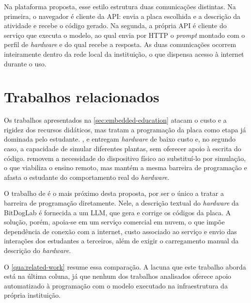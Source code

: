 Na plataforma proposta, esse estilo estrutura duas comunicações distintas. Na primeira, o navegador é cliente da API: envia a placa escolhida e a descrição da atividade e recebe o código gerado. Na segunda, a própria API é cliente do serviço que executa o modelo, ao qual envia por HTTP o \textit{prompt} montado com o perfil de \textit{hardware} e do qual recebe a resposta. As duas comunicações ocorrem inteiramente dentro da rede local da instituição, o que dispensa acesso à internet durante o uso.

\section{Trabalhos relacionados}
\label{sec:related-work}

Os trabalhos apresentados na \autoref{sec:embedded-education} atacam o custo e a rigidez dos recursos didáticos, mas tratam a programação da placa como etapa já dominada pelo estudante. ,  e  entregam \textit{hardware} de baixo custo e, no segundo caso, a capacidade de simular diferentes plantas, sem oferecer apoio à escrita do código.  removem a necessidade do dispositivo físico ao substituí-lo por simulação, o que viabiliza o ensino remoto, mas mantém a mesma barreira de programação e afasta o estudante do comportamento real do \textit{hardware}.

O trabalho de  é o mais próximo desta proposta, por ser o único a tratar a barreira de programação diretamente. Nele, a descrição textual do \textit{hardware} da BitDogLab é fornecida a um LLM, que gera e corrige os códigos da placa. A solução, porém, apoia-se em um serviço comercial em nuvem, o que impõe dependência de conexão com a internet, custo associado ao serviço e envio das interações dos estudantes a terceiros, além de exigir o carregamento manual da descrição do \textit{hardware}.

O \autoref{qua:related-work} resume essa comparação. A lacuna que este trabalho aborda está na última coluna, já que nenhum dos trabalhos analisados oferece apoio automatizado à programação com o modelo executado na infraestrutura da própria instituição.

